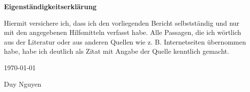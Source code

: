 \pagestyle{fancy}
\textbf{Eigenständigkeitserklärung}

\vspace{6pt}

Hiermit versichere ich, dass ich den vorliegenden Bericht selbstständig und nur mit den angegebenen Hilfsmitteln verfasst habe. Alle Passagen, die ich wörtlich aus der Literatur oder aus anderen Quellen wie z. B. Internetseiten übernommen habe, habe ich deutlich als Zitat mit Angabe der Quelle kenntlich gemacht. 

\begin{flushright}
	\today

	
	Duy Nguyen
\end{flushright}
